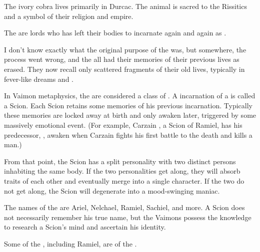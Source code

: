 The ivory cobra lives primarily in Durcac. The animal is sacred to the Rissitics and a symbol of their religion and empire. 



\gitempl{\Malach{}}{\Malachim{}}
The \Malachim{} are \resphan{} lords who has left their \resphan{} bodies to incarnate again and again as \humans{}. 

I don't know exactly what the original purpose of the \Malachim{} was, but somewhere, the process went wrong, and the \Malachim{} all had their memories of their previous lives as \resphain{} erased. They now recall only scattered fragments of their old lives, typically in fever-like dreams and \deajvus. 


In Vaimon metaphysics, the \Malachim{} are considered a class of \Archons{}. A \human{} incarnation of a \Malach{} is called a Scion. Each Scion retains some memories of his previous incarnation. Typically these memories are locked away at birth and only awaken later, triggered by some massively emotional event. (For example, Carzain \Shireyo, a Scion of Ramiel, has his predecessor, \VizicarFull, awaken when Carzain fights his first battle to the death and kills a man.) 

From that point, the Scion has a split personality with two distinct persons inhabiting the same body. If the two personalities get along, they will absorb traits of each other and eventually merge into a single character. If the two do not get along, the Scion will degenerate into a mood-swinging maniac.


The names of the \Malachim{} are Ariel, Nelchael, Ramiel, Sachiel, \Belzirmalach{} and more. A Scion does not necessarily remember his true name, but the Vaimons possess the knowledge to research a Scion's mind and ascertain his \Malach{} identity. 

Some of the \Malachim, including Ramiel, are of the \bloodresphain. 




